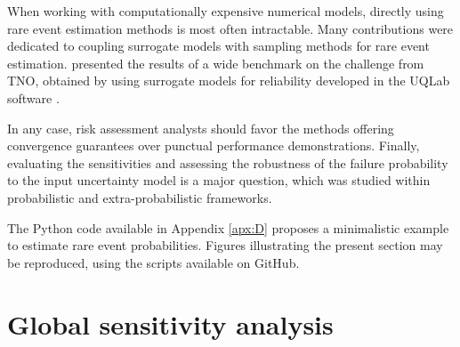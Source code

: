 
When working with computationally expensive numerical models, directly using rare event estimation methods is most often intractable. 
Many contributions were dedicated to coupling surrogate models with sampling methods for rare event estimation. 
\citet{moustapha_ss_2022} presented the results of a wide benchmark on the challenge from TNO, obtained by using surrogate models for reliability developed in the UQLab software \citep{marelli_2014_uqlab}.  

In any case, risk assessment analysts should favor the methods offering convergence guarantees over punctual performance demonstrations. 
Finally, evaluating the sensitivities and assessing the robustness of the failure probability to the input uncertainty model is a major question, which was studied within probabilistic \citep{lemaitre_2015_PLI,chabridon_2017,chabridon_2018_thesis,chabridon2021global} and extra-probabilistic \citep{ajenjo_2022_structural_safety,ajenjo_2023} frameworks. 


\begin{otexample}
    The Python code available in Appendix \ref{apx:D} proposes a minimalistic \ots example to estimate rare event probabilities. 
    Figures illustrating the present section may be reproduced, using the \ots scripts available on GitHub\footnotemark.  
\end{otexample}



\section{Global sensitivity analysis} \label{sec:gsa}

